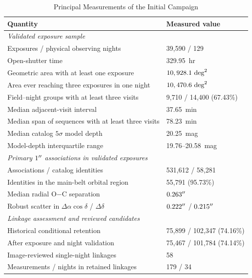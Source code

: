 \begin{table}[tbp]
\centering
\caption{Principal Measurements of the Initial Campaign}
\label{tab:results}
\begin{tabular}{ll}
\toprule
Quantity & Measured value\\
\midrule
\multicolumn{2}{l}{\textit{Validated exposure sample}}\\
Exposures / physical observing nights & 39,590 / 129\\
Open-shutter time & 329.95~hr\\
Geometric area with at least one exposure & $10,928.1~\mathrm{deg}^{2}$\\
Area ever reaching three exposures in one night & $10,470.6~\mathrm{deg}^{2}$\\
Field--night groups with at least three visits & 9,710 / 14,400 (67.43\%)\\
Median adjacent-visit interval & 37.65~min\\
Median span of sequences with at least three visits & 78.23~min\\
Median catalog $5\sigma$ model depth & 20.25~mag\\
Model-depth interquartile range & 19.76--20.58~mag\\
\midrule
\multicolumn{2}{l}{\textit{Primary $1^{\prime\prime}$ associations in validated exposures}}\\
Associations / catalog identities & 531,612 / 58,281\\
Identities in the main-belt orbital region & 55,791 (95.73\%)\\
Median radial O$-$C separation & $0.263^{\prime\prime}$\\
Robust scatter in $\Delta\alpha\cos\delta$ / $\Delta\delta$ & $0.222^{\prime\prime}$ / $0.215^{\prime\prime}$\\
\midrule
\multicolumn{2}{l}{\textit{Linkage assessment and reviewed candidates}}\\
Historical conditional retention & 75,899 / 102,347 (74.16\%)\\
After exposure and night validation & 75,467 / 101,784 (74.14\%)\\
Image-reviewed single-night linkages & 58\\
Measurements / nights in retained linkages & 179 / 34\\
\bottomrule
\end{tabular}
\end{table}

